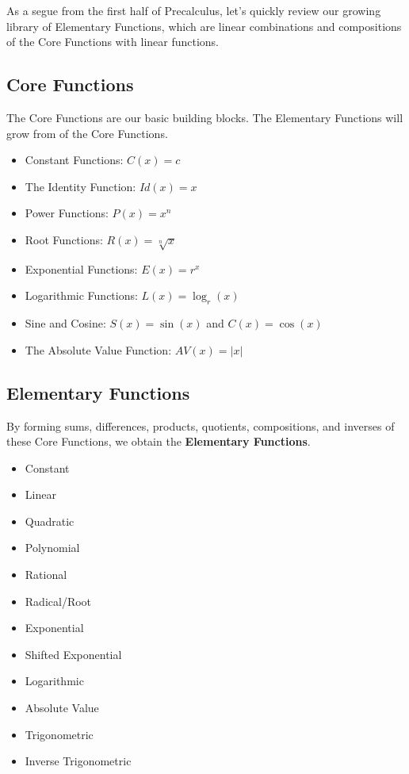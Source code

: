 \documentclass{ximera}
\begin{document}
As a segue from the first half of Precalculus, let's quickly review our growing library of Elementary Functions, which are linear combinations and compositions of the Core Functions with linear functions.


\subsection*{Core Functions} 

The Core Functions are our basic building blocks. The Elementary Functions will grow from of the Core Functions.

\begin{itemize}
\item{Constant Functions: $C(x) = c$}
\item{The Identity Function: $Id(x) = x$}
\item{Power Functions: $P(x) = x^n$}
\item{Root Functions: $R(x) = \sqrt[n]{x}$}
\item{Exponential Functions: $E(x) = r^x$}
\item{Logarithmic Functions: $L(x) = \log_r(x)$}
\item{Sine and Cosine: $S(x) = \sin(x)$ and $C(x) = \cos(x)$}
\item{The Absolute Value Function: $AV(x) = |x|$}
\end{itemize}


\subsection*{Elementary Functions} 

By forming sums, differences, products, quotients, compositions, and inverses of these Core Functions, we obtain the \textbf{Elementary Functions}.


\begin{itemize}
\item{Constant}
\item{Linear}
\item{Quadratic}
\item{Polynomial}
\item{Rational}
\item{Radical/Root}
\item{Exponential}
\item{Shifted Exponential}
\item{Logarithmic}
\item{Absolute Value}
\item{Trigonometric}
\item{Inverse Trigonometric}
\end{itemize}
\end{document}

